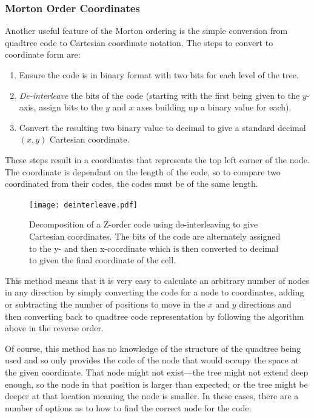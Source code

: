 \subsubsection*{Morton Order Coordinates}
\label{ssub:morton_order_coordinates}

Another useful feature of the Morton ordering is the simple conversion from
quadtree code to Cartesian coordinate notation. The steps to convert to
coordinate form are:

\begin{enumerate}
	\item Ensure the code is in binary format with two bits for each level of
		the tree.
	\item \emph{De-interleave} the bits of the code (starting with the first
		being given to the $y$-axis, assign bits to the $y$ and $x$ axes
		building up a binary value for each).
	\item Convert the resulting two binary value to decimal to give a standard
		decimal $(x,y)$ Cartesian coordinate.
\end{enumerate}

These steps result in a coordinates that represents the top left corner of the
node. The coordinate is dependant on the length of the code, so to compare two
coordinated from their codes, the codes must be of the same length.

\begin{figure}[tbh]
	\centering
	\texttt{[image: deinterleave.pdf]}

	\caption[Decomposition of a Z-order code to give coordinates.]{Decomposition
		of a Z-order code using de-interleaving to give Cartesian coordinates.
		The bits of the code are alternately assigned to the y- and then
		x-coordinate which is then converted to decimal to given the final
		coordinate of the cell.}\label{fig:deinterleave}
\end{figure}

This method means that it is very easy to calculate an arbitrary number of
nodes in any direction by simply converting the code for a node to coordinates,
adding or subtracting the number of positions to move in the $x$ and $y$
directions and then converting back to quadtree code representation by
following the algorithm above in the reverse order.

Of course, this method has no knowledge of the structure of the quadtree being
used and so only provides the code of the node that would occupy the space at
the given coordinate. That node might not exist---the tree might not extend
deep enough, so the node in that position is larger than expected; or the tree
might be deeper at that location meaning the node is smaller. In these cases,
there are a number of options as to how to find the correct node for the code:

